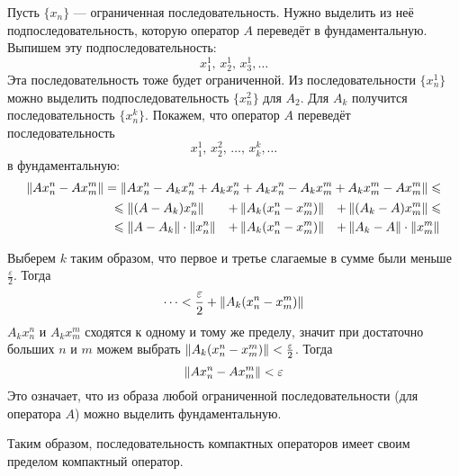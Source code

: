 \documentclass[12pt]{article}
\begin{document}
\begin{enumerate}
		Пусть $\{x_n\}$ --- ограниченная последовательность. Нужно выделить из неё подпоследовательность, которую оператор $A$ 
		переведёт в фундаментальную. Выпишем эту подпоследовательность:
		$$x_1^1,\,x_2^1,\,x_3^1,\dots$$
		Эта последовательность тоже будет ограниченной. Из последовательности $\{x^1_n\}$ можно выделить подпоследовательность 
		$\{x^2_n\}$ для $A_2$. Для $A_k$ получится последовательность $\{x^k_n\}$. Покажем, что оператор $A$ переведёт 
		последовательность
		$$x^1_1,\,x^2_2,\,\dots,\,x^k_k,\dots$$
		в фундаментальную:
		\begin{align*}
			\left\| Ax_n^n - Ax_m^m \right\| = \left\| Ax_n^n - A_kx^n_n + A_kx_n^n + A_kx_n^n - A_kx_m^m + A_kx_m^m - Ax_m^m \right\| \leqslant \\
			\begin{aligned}
				&\leqslant \left\| (A-A_k)x_n^n \right\| &+ &\left\| A_k(x_n^n - x_m^m) \right\| &+ &\left\| (A_k - A)x_m^m \right\| \leqslant \\
				&\leqslant \left\| A-A_k \right\|\cdot\left\| x_n^n \right\| &+ &\left\| A_k(x_n^n - x_m^m) \right\| &+ &\left\| A_k - A \right\| \cdot\left\| x_m^m \right\|
			\end{aligned}
		\end{align*}
		
		Выберем $k$ таким образом, что первое и третье слагаемые в сумме были меньше $\frac{\varepsilon}{2}$. Тогда 
		$$\dots < \frac{\varepsilon}{2} + \left\| A_k(x_n^n - x_m^m) \right\|$$
		$A_k x_n^n$ и $A_k x_m^m$ сходятся к одному и тому же пределу, значит при достаточно больших $n$ и $m$ можем выбрать
		$\left\| A_k(x_n^n - x_m^m) \right\| < \frac{\varepsilon}{2}$. Тогда
		$$\left\| Ax_n^n - Ax_m^m \right\| < \varepsilon$$
		Это означает, что из образа любой ограниченной последовательности (для оператора $A$) можно выделить фундаментальную.
		
		Таким образом, последовательность компактных операторов имеет своим пределом компактный оператор.
	\end{enumerate}
\end{document}

